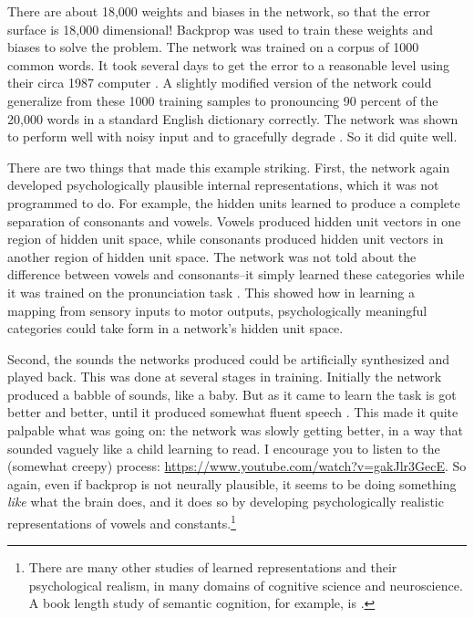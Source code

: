 There are about 18,000 weights and biases in the network, so that the error surface is 18,000 dimensional! Backprop was used to train these weights and biases to solve the problem. The network was trained on a corpus of 1000 common words. It took several days to get the error to a reasonable level using their circa 1987 computer \cite{sejnowski1987parallel}. A slightly modified version of the network could generalize from these 1000 training samples to pronouncing 90 percent of the 20,000 words in a standard English dictionary correctly. The network was shown to perform well with noisy input and to gracefully degrade \cite{sejnowski1987parallel}. So it did quite well.

There are two things that made this example striking. First, the network again developed psychologically plausible internal representations, which it was not programmed to do. For example, the hidden units learned to produce a complete separation of consonants and vowels. Vowels produced hidden unit vectors in one region of hidden unit space, while consonants produced hidden unit vectors in another region of hidden unit space. The network was not told about the difference between vowels and consonants--it simply learned these categories while it was trained on the pronunciation task \cite{sejnowski1987parallel}. This showed  how in learning a mapping from sensory inputs to motor outputs, psychologically meaningful categories could take form in a network's hidden unit space.

Second, the sounds the networks produced could be artificially synthesized and played back. This was done at several stages in training. Initially the network produced a babble of sounds, like a baby. But as it came to learn the task is got better and better, until it produced somewhat fluent speech \cite{sejnowski1987parallel}. This made it quite palpable what was going on: the network was slowly getting better, in a way that sounded vaguely like a child learning to read. I encourage you to listen to the (somewhat creepy) process: \url{https://www.youtube.com/watch?v=gakJlr3GecE}. So again, even if backprop is not neurally plausible, it seems to be doing something \emph{like} what the brain does, and it does so by developing psychologically realistic representations of vowels and constants.\footnote{There are many other studies of learned representations and their psychological realism, in many  domains of cognitive science and neuroscience. A book length  study of semantic cognition, for example, is \cite{rogers2004semantic}.}

